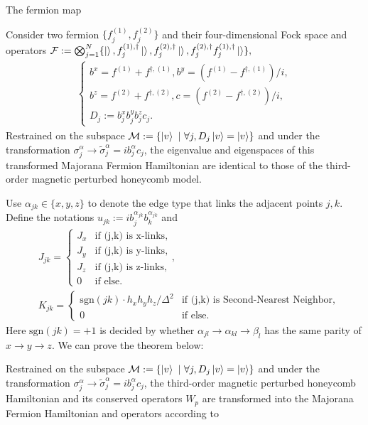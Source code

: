 \documentclass{beamer}
\begin{document}
\begin{frame}[allowframebreaks]{The fermion map} 
\begin{theorem}
      Consider two fermion $\{f_j^{(1)}, f_j^{(2)}\}$  and their four-dimensional Fock space and operators $\mathcal{F}:=\bigotimes_{j = 1}^N\{\ket{},f_j^{(1),\dagger}\ket{}, f_j^{(2),\dagger}\ket{}, f_j^{(2),\dagger} f_j^{(1),\dagger}\ket{}\},$
    \begin{align}
         \begin{cases}b^x = f^{(1)}+f^{\dagger,(1)}, b^y = ( f^{(1)}-f^{\dagger,(1)})/i,\\b^z =f^{(2)}+f^{\dagger,(2)},c = ( f^{(2)}-f^{\dagger,(2)})/i,\\ D_j :=b_j^x b_j^y b_j^zc_j  .\end{cases}
    \end{align}
    Restrained on the subspace $\mathcal{M}:= \{\ket{v} ~|~\forall j, D_j\ket{v} =  \ket{v}\}$ and under the transformation $\sigma_j^{\alpha} \to \tilde{\sigma}_j^{\alpha}=i b_j^{\alpha}c_j$, the eigenvalue and eigenspaces of this transformed Majorana Fermion Hamiltonian are identical to those of the third-order magnetic perturbed honeycomb model.     
\end{theorem}
\newpage
  Use $\alpha_{jk} \in \{x,y,z\}$ to denote the edge type that links the adjacent points $j,k$. Define the notations $\hat u_{jk}:= i b_j^{\alpha_{jk}}b_k^{\alpha_{jk}}$ and 
   \begin{align}
       &J_{{jk}} = \begin{cases}J_x &\text{if (j,k) is x-links,}\\J_y &\text{if (j,k) is y-links,}\\J_z &\text{if (j,k) is z-links,}\\0 &\text{if else.}\end{cases}, \\
       &K_{jk} = \begin{cases}\text{sgn}(jk) \cdot h_x h_yh_z/\Delta^2 &\text{if (j,k) is Second-Nearest Neighbor,}\\0 &\text{if else.}\end{cases}
   \end{align}
   Here $\text{sgn}(jk) = +1$ is decided by whether $\alpha_{jl}\to \alpha_{kl} \to \beta_{l}$ has the same parity of $x \to y \to z$.
   We can prove the theorem below:
\begin{theorem}
   Restrained on the subspace $\mathcal{M}:= \{\ket{v} ~|~\forall j, D_j\ket{v} =  \ket{v}\}$  and under the transformation $\sigma_j^{\alpha} \to \tilde{\sigma}_j^{\alpha}=i b_j^{\alpha}c_j$, the third-order magnetic perturbed honeycomb Hamiltonian and its conserved operators $W_p$ are transformed into the Majorana Fermion Hamiltonian and operators according to

\end{theorem}
\end{frame}
\end{document}
